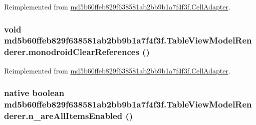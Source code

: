 Reimplemented from \hyperlink{classmd5b60ffeb829f638581ab2bb9b1a7f4f3f_1_1_cell_adapter_59b12b00e8c034309892498bbef078d4}{md5b60ffeb829f638581ab2bb9b1a7f4f3f.CellAdapter}.\hypertarget{classmd5b60ffeb829f638581ab2bb9b1a7f4f3f_1_1_table_view_model_renderer_92f10ed6c4706c14be7fcc1b40449cb2}{
\subsubsection[{monodroidClearReferences}]{\setlength{\rightskip}{0pt plus 5cm}void md5b60ffeb829f638581ab2bb9b1a7f4f3f.TableViewModelRenderer.monodroidClearReferences ()}}
\label{classmd5b60ffeb829f638581ab2bb9b1a7f4f3f_1_1_table_view_model_renderer_92f10ed6c4706c14be7fcc1b40449cb2}




Reimplemented from \hyperlink{classmd5b60ffeb829f638581ab2bb9b1a7f4f3f_1_1_cell_adapter_ad3dc816719d492f2fa5de60860e45e7}{md5b60ffeb829f638581ab2bb9b1a7f4f3f.CellAdapter}.\hypertarget{classmd5b60ffeb829f638581ab2bb9b1a7f4f3f_1_1_table_view_model_renderer_070e14dfb258fab5686a96c5ab9e3d00}{
\subsubsection[{n\_\-areAllItemsEnabled}]{\setlength{\rightskip}{0pt plus 5cm}native boolean md5b60ffeb829f638581ab2bb9b1a7f4f3f.TableViewModelRenderer.n\_\-areAllItemsEnabled ()}}
\label{classmd5b60ffeb829f638581ab2bb9b1a7f4f3f_1_1_table_view_model_renderer_070e14dfb258fab5686a96c5ab9e3d00}


